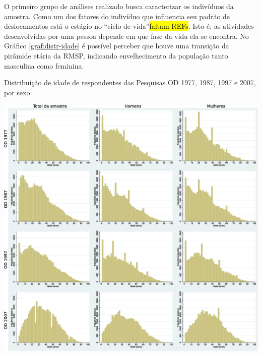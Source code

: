 O primeiro grupo de análises realizado busca caracterizar os indivíduos da amostra. Como um dos fatores do indivíduo que influencia seu padrão de deslocamentos está o estágio no ``ciclo de vida''\hl{faltam REFs}. Isto é, as atividades desenvolvidas por uma pessoa depende em que fase da vida ela se encontra. No Gráfico \ref{graf:distr-idade} é possível perceber que houve uma transição da pirâmide etária da RMSP, indicando envelhecimento da população tanto masculina como feminina.

\begin{grafico}[htb]%
    \caption{\label{graf:distr-idade}Distribuição de idade de respondentes das Pesquisas OD 1977, 1987, 1997 e 2007, por sexo}%
    \begin{center}%
        \includegraphics[width=1\textwidth]{./imagens/idade2.eps}%
    \end{center}%
\end{grafico}%


